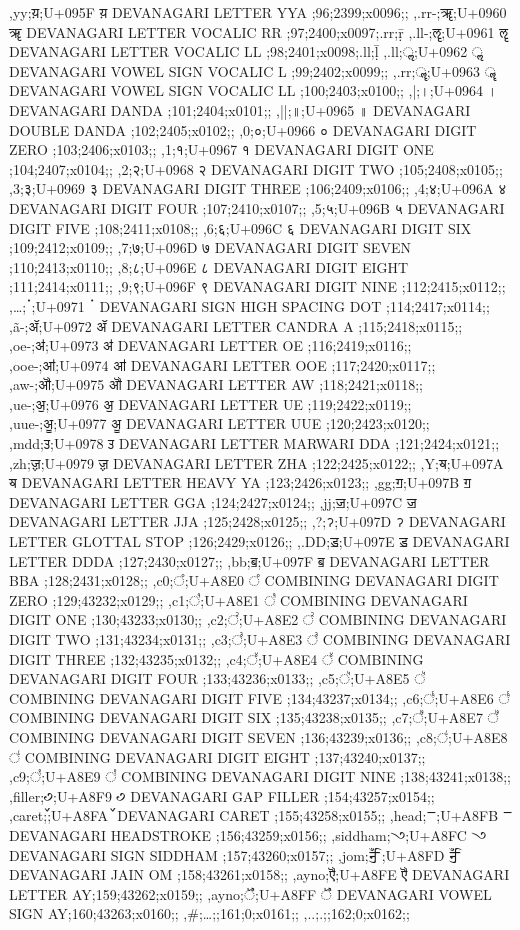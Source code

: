 \documentclass{article}
\begin{document}
{,yy;य़;U+095F य़ DEVANAGARI LETTER YYA ;96;2399;x0096;;
,.rr-;ॠ;U+0960 ॠ DEVANAGARI LETTER VOCALIC RR ;97;2400;x0097;.rr;ṝ 
,.ll-;ॡ;U+0961 ॡ DEVANAGARI LETTER VOCALIC LL ;98;2401;x0098;.ll;ḹ 
,.ll;ॢ;U+0962 ॢ DEVANAGARI VOWEL SIGN VOCALIC L ;99;2402;x0099;;
,.rr;ॣ;U+0963 ॣ DEVANAGARI VOWEL SIGN VOCALIC LL ;100;2403;x0100;;
,|;।;U+0964 । DEVANAGARI DANDA ;101;2404;x0101;;
,||;॥;U+0965 ॥ DEVANAGARI DOUBLE DANDA ;102;2405;x0102;;
,0;०;U+0966 ० DEVANAGARI DIGIT ZERO ;103;2406;x0103;;
,1;१;U+0967 १ DEVANAGARI DIGIT ONE ;104;2407;x0104;;
,2;२;U+0968 २ DEVANAGARI DIGIT TWO ;105;2408;x0105;;
,3;३;U+0969 ३ DEVANAGARI DIGIT THREE ;106;2409;x0106;;
,4;४;U+096A ४ DEVANAGARI DIGIT FOUR ;107;2410;x0107;;
,5;५;U+096B ५ DEVANAGARI DIGIT FIVE ;108;2411;x0108;;
,6;६;U+096C ६ DEVANAGARI DIGIT SIX ;109;2412;x0109;;
,7;७;U+096D ७ DEVANAGARI DIGIT SEVEN ;110;2413;x0110;;
,8;८;U+096E ८ DEVANAGARI DIGIT EIGHT ;111;2414;x0111;;
,9;९;U+096F ९ DEVANAGARI DIGIT NINE ;112;2415;x0112;;
%  
,…;ॱ;U+0971 ॱ DEVANAGARI SIGN HIGH SPACING DOT ;114;2417;x0114;;
,\~a-;ॲ;U+0972 ॲ DEVANAGARI LETTER CANDRA A ;115;2418;x0115;;
,oe-;ॳ;U+0973 ॳ DEVANAGARI LETTER OE ;116;2419;x0116;;
,ooe-;ॴ;U+0974 ॴ DEVANAGARI LETTER OOE ;117;2420;x0117;;
,aw-;ॵ;U+0975 ॵ DEVANAGARI LETTER AW ;118;2421;x0118;;
,ue-;ॶ;U+0976 ॶ DEVANAGARI LETTER UE ;119;2422;x0119;;
,uue-;ॷ;U+0977 ॷ DEVANAGARI LETTER UUE ;120;2423;x0120;;
,mdd;ॸ;U+0978 ॸ DEVANAGARI LETTER MARWARI DDA ;121;2424;x0121;;
,zh;ॹ;U+0979 ॹ DEVANAGARI LETTER ZHA ;122;2425;x0122;;
,Y;ॺ;U+097A ॺ DEVANAGARI LETTER HEAVY YA ;123;2426;x0123;;
,gg;ॻ;U+097B ॻ DEVANAGARI LETTER GGA ;124;2427;x0124;;
,jj;ॼ;U+097C ॼ DEVANAGARI LETTER JJA ;125;2428;x0125;;
,?;ॽ;U+097D ॽ DEVANAGARI LETTER GLOTTAL STOP ;126;2429;x0126;;
,.DD;ॾ;U+097E ॾ DEVANAGARI LETTER DDDA ;127;2430;x0127;;
,bb;ॿ;U+097F ॿ DEVANAGARI LETTER BBA ;128;2431;x0128;;
,c0;꣠;U+A8E0 ꣠ COMBINING DEVANAGARI DIGIT ZERO ;129;43232;x0129;;
,c1;꣡;U+A8E1 ꣡ COMBINING DEVANAGARI DIGIT ONE ;130;43233;x0130;;
,c2;꣢;U+A8E2 ꣢ COMBINING DEVANAGARI DIGIT TWO ;131;43234;x0131;;
,c3;꣣;U+A8E3 ꣣ COMBINING DEVANAGARI DIGIT THREE ;132;43235;x0132;;
,c4;꣤;U+A8E4 ꣤ COMBINING DEVANAGARI DIGIT FOUR ;133;43236;x0133;;
,c5;꣥;U+A8E5 ꣥ COMBINING DEVANAGARI DIGIT FIVE ;134;43237;x0134;;
,c6;꣦;U+A8E6 ꣦ COMBINING DEVANAGARI DIGIT SIX ;135;43238;x0135;;
,c7;꣧;U+A8E7 ꣧ COMBINING DEVANAGARI DIGIT SEVEN ;136;43239;x0136;;
,c8;꣨;U+A8E8 ꣨ COMBINING DEVANAGARI DIGIT EIGHT ;137;43240;x0137;;
,c9;꣩;U+A8E9 ꣩ COMBINING DEVANAGARI DIGIT NINE ;138;43241;x0138;;
%  
%  
%  
%  
%  
%  
%  
%  
%  
%  
%  
%  
%  
%  
%  
,filler;꣹;U+A8F9 ꣹ DEVANAGARI GAP FILLER ;154;43257;x0154;;
,caret;꣺;U+A8FA ꣺ DEVANAGARI CARET ;155;43258;x0155;;
,head;ꣻ;U+A8FB ꣻ DEVANAGARI HEADSTROKE ;156;43259;x0156;;
,siddham;꣼;U+A8FC ꣼ DEVANAGARI SIGN SIDDHAM ;157;43260;x0157;;
,jom;ꣽ;U+A8FD ꣽ DEVANAGARI JAIN OM ;158;43261;x0158;;
,ayno;ꣾ;U+A8FE ꣾ DEVANAGARI LETTER AY;159;43262;x0159;;
,ayno;ꣿ;U+A8FF ꣿ DEVANAGARI VOWEL SIGN AY;160;43263;x0160;;
,\#;…;;161;0;x0161;;
,..;.;;162;0;x0162;;
}
\end{document}
